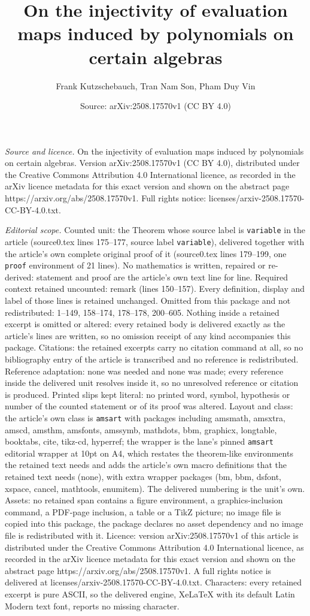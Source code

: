 \documentclass[10pt,a4paper]{amsart}
\title[On the injectivity of evaluation maps induced by polynomials]{On the injectivity of evaluation maps induced by polynomials on certain algebras}
\author{Frank Kutzschebauch, Tran Nam Son, Pham Duy Vin}
\date{Source: arXiv:2508.17570v1 (CC BY 4.0)}
\begin{document}
\maketitle

\noindent\emph{Source and licence.} On the injectivity of evaluation maps induced by polynomials on certain algebras. Version arXiv:2508.17570v1 (CC BY 4.0), distributed under the Creative Commons Attribution 4.0 International licence, as recorded in the arXiv licence metadata for this exact version and shown on the abstract page https://arxiv.org/abs/2508.17570v1. Full rights notice: licenses/arxiv-2508.17570-CC-BY-4.0.txt.\par\smallskip

\noindent\textit{Editorial scope.} Counted unit: the Theorem whose source label is \texttt{variable} in the article (source0.tex lines 175--177, source label \texttt{variable}), delivered together with the article's own complete original proof of it (source0.tex lines 179--199, one \texttt{proof} environment of 21 lines). No mathematics is written, repaired or re-derived: statement and proof are the article's own text line for line. Required context retained uncounted: remark (lines 150--157). Every definition, display and label of those lines is retained unchanged. Omitted from this package and not redistributed: 1--149, 158--174, 178--178, 200--605. Nothing inside a retained excerpt is omitted or altered: every retained body is delivered exactly as the article's lines are written, so no omission receipt of any kind accompanies this package. Citations: the retained excerpts carry no citation command at all, so no bibliography entry of the article is transcribed and no reference is redistributed. Reference adaptation: none was needed and none was made; every reference inside the delivered unit resolves inside it, so no unresolved reference or citation is produced. Printed slips kept literal: no printed word, symbol, hypothesis or number of the counted statement or of its proof was altered. Layout and class: the article's own class is \texttt{amsart} with packages including amsmath, amsxtra, amscd, amsthm, amsfonts, amssymb, mathdots, bbm, graphicx, longtable, booktabs, cite, tikz-cd, hyperref; the wrapper is the lane's pinned \texttt{amsart} editorial wrapper at 10pt on A4, which restates the theorem-like environments the retained text needs and adds the article's own macro definitions that the retained text needs (none), with extra wrapper packages (bm, bbm, dsfont, xspace, cancel, mathtools, enumitem). The delivered numbering is the unit's own. Assets: no retained span contains a figure environment, a graphics-inclusion command, a PDF-page inclusion, a table or a TikZ picture; no image file is copied into this package, the package declares no asset dependency and no image file is redistributed with it. Licence: version arXiv:2508.17570v1 of this article is distributed under the Creative Commons Attribution 4.0 International licence, as recorded in the arXiv licence metadata for this exact version and shown on the abstract page https://arxiv.org/abs/2508.17570v1. A full rights notice is delivered at licenses/arxiv-2508.17570-CC-BY-4.0.txt. Characters: every retained excerpt is pure ASCII, so the delivered engine, XeLaTeX with its default Latin Modern text font, reports no missing character.
\end{document}
